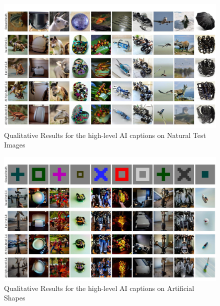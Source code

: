 \begin{figure}[ht]
   \centering
   \includegraphics[width=1\textwidth]{plots/aicap_qual_test_highlevel_appendix.JPEG}
   \caption{Qualitative Results for the high-level AI captions on Natural Test Images}\label{fig:aicap_qual_test_highlevel_appendix}
\end{figure}

\begin{figure}[ht]
   \centering
   \includegraphics[width=1\textwidth]{plots/aicap_qual_art_highlevel_appendix.JPEG}
   \caption{Qualitative Results for the high-level AI captions on Artificial Shapes}\label{fig:aicap_qual_art_highlevel_appendix}
\end{figure}


